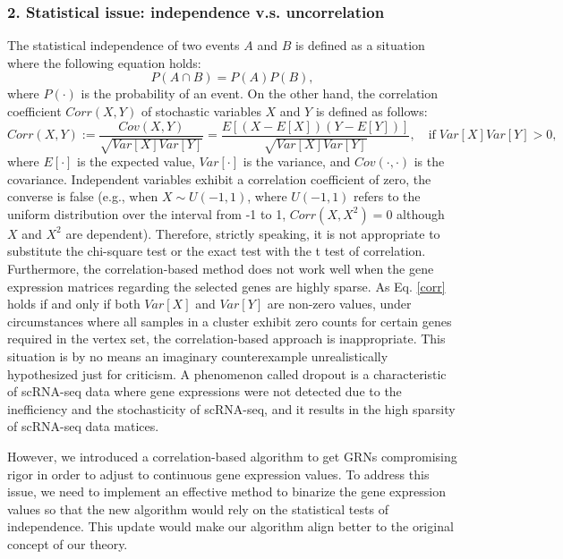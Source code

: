 \documentclass{article}
\begin{document}
\subsubsection*{2. Statistical issue: independence v.s. uncorrelation}
The statistical independence of two events $A$ and $B$ is defined as a situation where the following equation holds:
\begin{equation}\label{independence}
  P(A\cap B)=P(A)P(B),
\end{equation}
where $P(\cdot)$ is the probability of an event. On the other hand, the correlation coefficient $Corr(X, Y)$ of stochastic variables 
$X$ and $Y$ is defined as follows:
\begin{equation}\label{corr}
  Corr(X, Y):=\frac{Cov(X, Y)}{\sqrt{Var[X]Var[Y]}}=\frac{E[(X-E[X])(Y-E[Y])]}{\sqrt{Var[X]Var[Y]}},\quad \text{if}\; Var[X]Var[Y] > 0,
\end{equation}
where $E[\cdot]$ is the expected value, $Var[\cdot]$ is the variance, and $Cov(\cdot, \cdot)$ is the covariance. Independent variables 
exhibit a correlation coefficient of zero, the converse is false (e.g., when $X\sim U(-1, 1)$, where $U(-1, 1)$ refers to the uniform 
distribution over the interval from -1 to 1, $Corr(X, X^2)=0$ although $X$ and $X^2$ are dependent). Therefore, strictly 
speaking, it is not appropriate to substitute the chi-square test or the exact test with the t test of correlation. 
Furthermore, the correlation-based method does not work well when the gene expression matrices regarding the 
selected genes are highly sparse. As Eq. \eqref{corr} holds if and only if both $Var[X]$ and $Var[Y]$ are non-zero values, under 
circumstances where all samples in a cluster exhibit zero counts for certain genes required in the vertex set, 
the correlation-based approach is inappropriate. This situation is by no means an imaginary counterexample 
unrealistically hypothesized just for criticism. A phenomenon called dropout is a characteristic of scRNA-seq data 
where gene expressions were not detected due to the inefficiency and the stochasticity of scRNA-seq\cite{qiu2020embracing}, and it 
results in the high sparsity of scRNA-seq data matices.

However, we introduced a correlation-based algorithm to get GRNs compromising rigor in order to adjust to 
continuous gene expression values. To address this issue, we need to implement an effective method to binarize the 
gene expression values so that the new algorithm would rely on the statistical tests of independence. This update 
would make our algorithm align better to the original concept of our theory.
\end{document}

